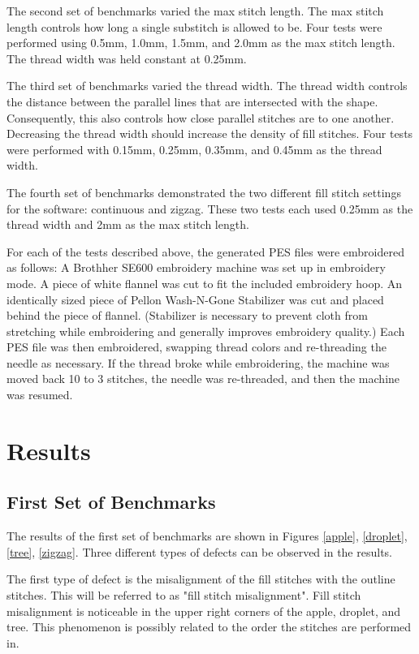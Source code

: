 \documentclass{article}
\begin{document}
The second set of benchmarks varied the max stitch length. The max stitch length controls how long a single substitch is allowed to be. Four tests were performed using 0.5mm, 1.0mm, 1.5mm, and 2.0mm as the max stitch length. The thread width was held constant at 0.25mm.

The third set of benchmarks varied the thread width. The thread width controls the distance between the parallel lines that are intersected with the shape. Consequently, this also controls how close parallel stitches are to one another. Decreasing the thread width should increase the density of fill stitches. Four tests were performed with 0.15mm, 0.25mm, 0.35mm, and 0.45mm as the thread width.

The fourth set of benchmarks demonstrated the two different fill stitch settings for the software: continuous and zigzag. These two tests each used 0.25mm as the thread width and 2mm as the max stitch length.

For each of the tests described above, the generated PES files were embroidered as follows: A Brothher SE600 embroidery machine was set up in embroidery mode. A piece of white flannel was cut to fit the included embroidery hoop. An identically sized piece of Pellon Wash-N-Gone Stabilizer was cut and placed behind the piece of flannel. (Stabilizer is necessary to prevent cloth from stretching while embroidering and generally improves embroidery quality.) Each PES file was then embroidered, swapping thread colors and re-threading the needle as necessary. If the thread broke while embroidering, the machine was moved back 10 to 3 stitches, the needle was re-threaded, and then the machine was resumed.

\section{Results}

\subsection{First Set of Benchmarks}

The results of the first set of benchmarks are shown in Figures \ref{apple}, \ref{droplet}, \ref{tree}, \ref{zigzag}. Three different types of defects can be observed in the results. 

The first type of defect is the misalignment of the fill stitches with the outline stitches. This will be referred to as "fill stitch misalignment". Fill stitch misalignment is noticeable in the upper right corners of the apple, droplet, and tree. This phenomenon is possibly related to the order the stitches are performed in. 
\end{document}
